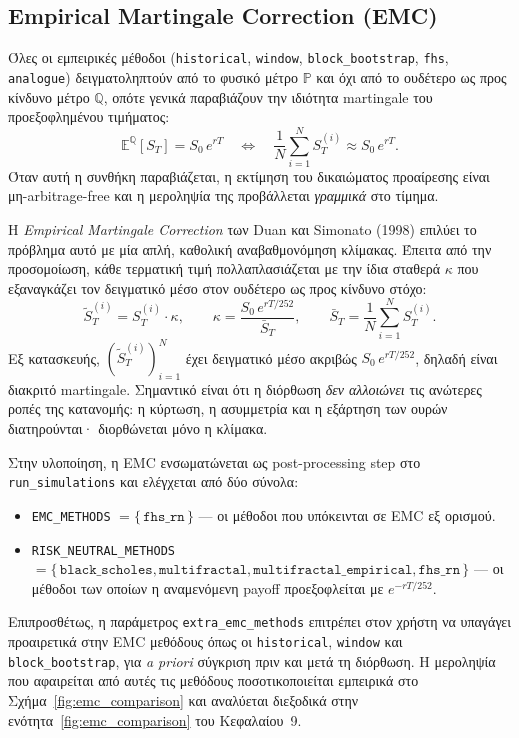 \documentclass[12pt]{article}
\begin{document}
\subsection{Empirical Martingale Correction (EMC)}
\label{sec:emc_theory}
Όλες οι εμπειρικές μέθοδοι (\texttt{historical}, \texttt{window}, \texttt{block\_bootstrap}, \texttt{fhs}, \texttt{analogue}) δειγματοληπτούν από το φυσικό μέτρο $\mathbb{P}$ και όχι από το ουδέτερο ως προς κίνδυνο μέτρο $\mathbb{Q}$, οπότε γενικά παραβιάζουν την ιδιότητα martingale του προεξοφλημένου τιμήματος:
\[
  \mathbb{E}^{\mathbb{Q}}[S_T] = S_0\, e^{rT} \quad\Longleftrightarrow\quad
  \frac{1}{N}\sum_{i=1}^{N} S_T^{(i)} \approx S_0\, e^{rT}.
\]
Όταν αυτή η συνθήκη παραβιάζεται, η εκτίμηση του δικαιώματος προαίρεσης είναι μη-arbitrage-free και η μεροληψία της προβάλλεται \emph{γραμμικά} στο τίμημα.

Η \emph{Empirical Martingale Correction} των Duan και Simonato (1998) επιλύει το πρόβλημα αυτό με μία απλή, καθολική αναβαθμονόμηση κλίμακας. Έπειτα από την προσομοίωση, κάθε τερματική τιμή πολλαπλασιάζεται με την ίδια σταθερά $\kappa$ που εξαναγκάζει τον δειγματικό μέσο στον ουδέτερο ως προς κίνδυνο στόχο:
\[
  \tilde{S}_T^{(i)} = S_T^{(i)} \cdot \kappa,
  \qquad
  \kappa = \frac{S_0\, e^{rT/252}}{\bar{S}_T},
  \qquad
  \bar{S}_T = \frac{1}{N}\sum_{i=1}^{N} S_T^{(i)}.
\]
Εξ κατασκευής, $(\tilde{S}_T^{(i)})_{i=1}^{N}$ έχει δειγματικό μέσο ακριβώς $S_0\, e^{rT/252}$, δηλαδή είναι διακριτό martingale. Σημαντικό είναι ότι η διόρθωση \emph{δεν αλλοιώνει} τις ανώτερες ροπές της κατανομής: η κύρτωση, η ασυμμετρία και η εξάρτηση των ουρών διατηρούνται· διορθώνεται μόνο η κλίμακα.

Στην υλοποίηση, η EMC ενσωματώνεται ως post-processing step στο \texttt{run\_simulations} και ελέγχεται από δύο σύνολα:
\begin{itemize}
  \item \texttt{EMC\_METHODS} $= \{\,\texttt{fhs\_rn}\,\}$ — οι μέθοδοι που υπόκεινται σε EMC εξ ορισμού.
  \item \texttt{RISK\_NEUTRAL\_METHODS} $= \{\,\texttt{black\_scholes}, \texttt{multifractal}, \texttt{multifractal\_empirical}, \texttt{fhs\_rn}\,\}$ — οι μέθοδοι των οποίων η αναμενόμενη payoff προεξοφλείται με $e^{-rT/252}$.
\end{itemize}
Επιπροσθέτως, η παράμετρος \texttt{extra\_emc\_methods} επιτρέπει στον χρήστη να  υπαγάγει προαιρετικά στην EMC μεθόδους όπως οι \texttt{historical}, \texttt{window} και \texttt{block\_bootstrap}, για \emph{a priori} σύγκριση πριν και μετά τη διόρθωση. Η μεροληψία που αφαιρείται από αυτές τις μεθόδους ποσοτικοποιείται εμπειρικά στο Σχήμα~\ref{fig:emc_comparison} και αναλύεται διεξοδικά στην ενότητα~\ref{fig:emc_comparison} του Κεφαλαίου~9.
\end{document}
